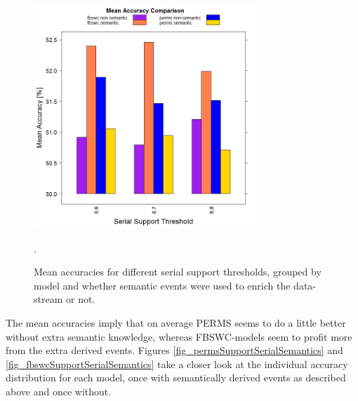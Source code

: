 \begin{figure}
	\centering
  	\includegraphics[width=0.75\textwidth]{semanticVsNonSemanticAccuracy}
	\caption{Mean accuracies for different serial support thresholds, grouped by model and whether semantic events were used to enrich the data-stream or not.}.
	\label{fig_semanticVsNonSemanticAccuracy}
\end{figure}

The mean accuracies imply that on average PERMS seems to do a little better without extra semantic knowledge, whereas FBSWC-models seem to profit more from the extra derived events. Figures \ref{fig_permsSupportSerialSemantics} and \ref{fig_fbswcSupportSerialSemantics} take a closer look at the individual accuracy distribution for each model, once with semantically derived events as described above and once without.

